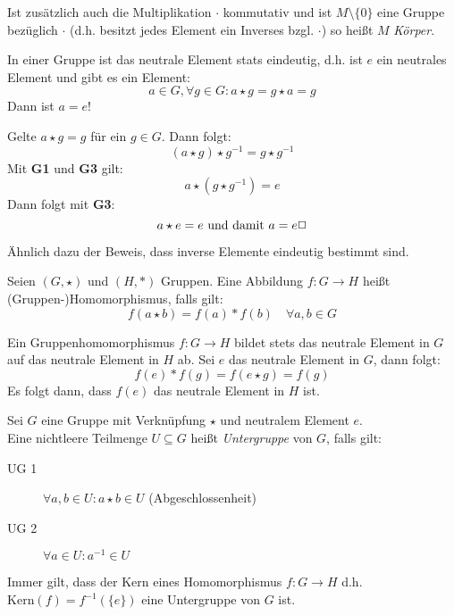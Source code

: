 \vspace{1em}
Ist zusätzlich auch die Multiplikation $\cdot$ kommutativ und ist $M\setminus\{0\}$ eine Gruppe bezüglich $\cdot$ (d.h. besitzt jedes Element ein Inverses bzgl. $\cdot$) so heißt $M$ \emph{Körper}.

In einer Gruppe ist das neutrale Element stats eindeutig, d.h. ist $e$ ein neutrales Element und gibt es ein Element:
\begin{equation*}
  a\in G, \forall g\in G : a\star g = g\star a = g
\end{equation*}
Dann ist $a = e$!

\beweis
Gelte $a\star g = g$ für ein $g\in G$. Dann folgt:
\begin{equation*}
  (a\star g)\star g^{-1}=g\star g^{-1}
\end{equation*}
Mit \textbf{G1} und \textbf{G3} gilt:
\begin{equation*}
  a\star (g\star g^{-1})=e
\end{equation*}
Dann folgt mit \textbf{G3}:
\begin{equation*}
  a\star e=e \text{ und damit } a=e \hfill\Box
\end{equation*}

\bemerkung
Ähnlich dazu der Beweis, dass inverse Elemente eindeutig bestimmt sind.


Seien $(G,\star)$ und $(H,\ast)$ Gruppen. Eine Abbildung $f:G\rightarrow H$ heißt (Gruppen-)Homomorphismus, falls gilt:
\begin{equation*}
  f(a\star b)=f(a)\ast f(b)\quad\forall a,b\in G
\end{equation*}

\lemma{}
Ein Gruppenhomomorphismus $f:G\rightarrow H$ bildet stets das neutrale Element in $G$ auf das neutrale Element in $H$ ab.
\beweis
Sei $e$ das neutrale Element in $G$, dann folgt:
\begin{equation*}
  f(e)\ast f(g)=f(e\star g)=f(g)
\end{equation*}
Es folgt dann, dass $f(e)$ das neutrale Element in $H$ ist.


Sei $G$ eine Gruppe mit Verknüpfung $\star$ und neutralem Element $e$.\\
Eine nichtleere Teilmenge $U\subseteq G$ heißt \emph{Untergruppe} von $G$, falls gilt:
\begin{description}
  \item[UG 1] $\forall a,b\in U : a\star b\in U$ (Abgeschlossenheit)
  \item[UG 2] $\forall a\in U : a^{-1}\in U$
\end{description}

Immer gilt, dass der Kern eines Homomorphismus $f:G \rightarrow H$ d.h. $\mathrm{Kern}(f)=f^{-1}(\{e\})$  eine Untergruppe von $G$ ist.
